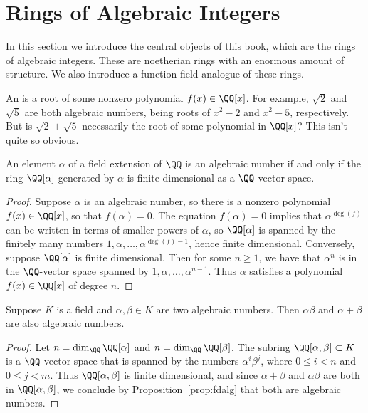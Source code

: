 \section{Rings of Algebraic Integers}

In this section we introduce the central objects of this book, which
are the rings of algebraic integers.  These are noetherian rings with
an enormous amount of structure.  We also introduce a function field
analogue of these rings.


An  is a root of some nonzero polynomial $f(x) \in \QQ[x]$.
For example, $\sqrt{2}$ and $\sqrt{5}$ are both algebraic numbers, being
roots of $x^2-2$ and $x^2-5$, respectively.
But is $\sqrt{2} + \sqrt{5}$ necessarily the root of some polynomial in $\QQ[x]$?
This isn't quite so obvious.

\begin{proposition}\label{prop:fdalg}
  An element $\alpha$ of a field extension of $\QQ$ is an
  algebraic number if and only if the ring $\QQ[\alpha]$
  generated by $\alpha$ is finite dimensional as a $\QQ$ vector
  space.
\end{proposition}
\begin{proof}
  Suppose $\alpha$ is an algebraic number, so there is a nonzero
  polynomial $f(x)\in\QQ[x]$, so that $f(\alpha)=0$. The equation
  $f(\alpha)=0$ implies that $\alpha^{\deg(f)}$ can be written in
  terms of smaller powers of $\alpha$, so $\QQ[\alpha]$ is spanned
  by the finitely many numbers $1,\alpha,\dots,\alpha^{\deg(f)-1}$,
  hence finite dimensional. Conversely, suppose $\QQ[\alpha]$ is finite
  dimensional.  Then for some $n\geq 1$, we have that $\alpha^n$ is in
  the $\QQ$-vector space spanned by $1,\alpha,\dots, \alpha^{n-1}$.
  Thus $\alpha$ satisfies a polynomial $f(x) \in \QQ[x]$ of degree $n$.
\end{proof}

\begin{proposition}\label{prop:algnumfield}
  Suppose $K$ is a field and $\alpha, \beta\in K$ are two
  algebraic numbers. Then $\alpha\beta$ and $\alpha+\beta$
  are also algebraic numbers.
\end{proposition}
\begin{proof}
  Let $n = \dim_\QQ \QQ[\alpha]$ and $n = \dim_\QQ \QQ[\beta]$.
  The subring $\QQ[\alpha,\beta]\subset K$ is a
  $\QQ$-vector space that is spanned by the numbers $\alpha^i\beta^j$,
  where $0\leq i<n$ and $0\leq j<m$. Thus
  $\QQ[\alpha,\beta]$ is finite dimensional, and since $\alpha+\beta$
  and $\alpha\beta$ are both in $\QQ[\alpha,\beta]$, we conclude by Proposition~\ref{prop:fdalg} that both are algebraic numbers.
\end{proof}


